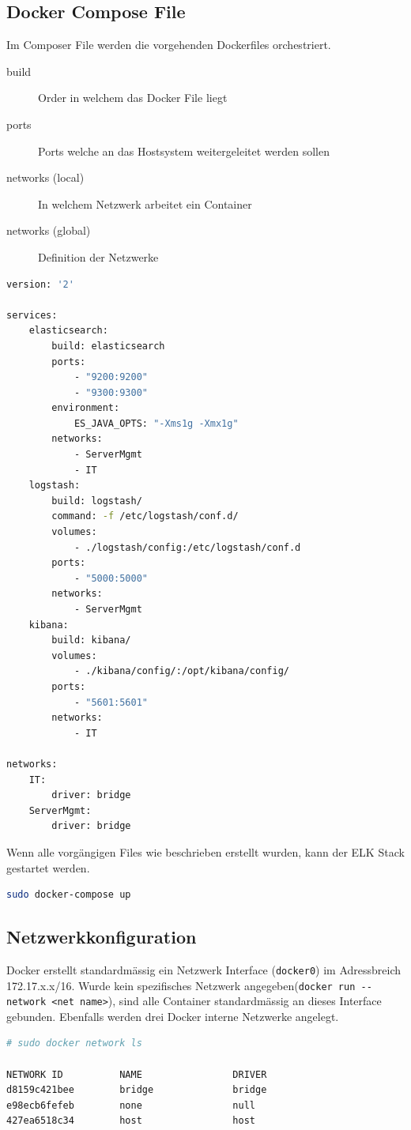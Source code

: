 \subsection{Docker Compose File}
Im Composer File werden die vorgehenden Dockerfiles orchestriert.
\begin{description}
	\item[build] Order in welchem das Docker File liegt
	\item[ports] Ports welche an das Hostsystem weitergeleitet werden sollen
	\item[networks (local)] In welchem Netzwerk arbeitet ein Container
	\item[networks (global)] Definition der Netzwerke
\end{description}
\begin{lstlisting}[caption=docker-compose.yml Compose File, language=bash]
version: '2'

services:
	elasticsearch:
		build: elasticsearch
		ports:
			- "9200:9200"
			- "9300:9300"
		environment:
			ES_JAVA_OPTS: "-Xms1g -Xmx1g"
		networks:
			- ServerMgmt
			- IT
	logstash:
		build: logstash/
		command: -f /etc/logstash/conf.d/
		volumes:
			- ./logstash/config:/etc/logstash/conf.d
		ports:
			- "5000:5000"
		networks:
			- ServerMgmt
	kibana:
		build: kibana/
		volumes:
			- ./kibana/config/:/opt/kibana/config/
		ports:
			- "5601:5601"
		networks:
			- IT

networks:
	IT:
		driver: bridge
	ServerMgmt:
		driver: bridge
\end{lstlisting}

Wenn alle vorgängigen Files wie beschrieben erstellt wurden, kann der ELK Stack gestartet werden.
\begin{lstlisting}[language=bash]
sudo docker-compose up
\end{lstlisting}


\subsection{Netzwerkkonfiguration}
Docker erstellt standardmässig ein Netzwerk Interface (\lstinline[]|docker0|) im Adressbreich 172.17.x.x/16. Wurde kein spezifisches Netzwerk angegeben(\lstinline[]|docker run --network <net name>|), sind alle Container standardmässig an dieses Interface gebunden. Ebenfalls werden drei Docker interne Netzwerke angelegt.
\begin{lstlisting}[language=bash]
# sudo docker network ls

NETWORK ID          NAME                DRIVER
d8159c421bee        bridge              bridge              
e98ecb6fefeb        none                null                
427ea6518c34        host                host    
\end{lstlisting}

